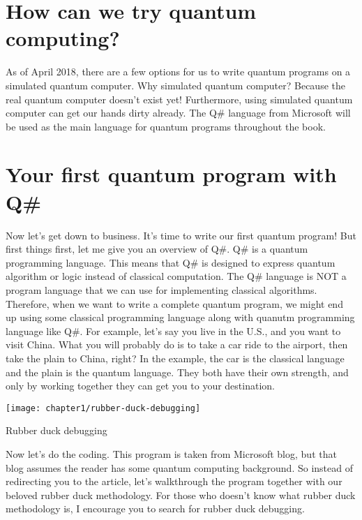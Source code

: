 \section{\textbf{How} can we try quantum computing?}

\begin{fullwidth}

As of April 2018, there are a few options for us to write quantum programs on a simulated quantum computer.
Why simulated quantum computer? Because the real quantum computer doesn't exist yet!
Furthermore, using simulated quantum computer can get our hands dirty already.
The Q\# language from Microsoft will be used as the main language for quantum programs throughout the book.

\end{fullwidth}


\section{Your first quantum program with Q\#}

\begin{fullwidth}

Now let's get down to business. It's time to write our first quantum program!
But first things first, let me give you an overview of Q\#.
Q\# is a quantum programming language.
This means that Q\# is designed to express quantum algorithm or logic instead of classical computation.
The Q\# language is NOT a program language that we can use for implementing classical algorithms.
Therefore, when we want to write a complete quantum program, we might end up using some classical programming language along with quanutm programming language like Q\#.
For example, let's say you live in the U.S., and you want to visit China.
What you will probably do is to take a car ride to the airport, then take the plain to China, right?
In the example, the car is the classical language and the plain is the quantum language.
They both have their own strength, and only by working together they can get you to your destination.

\end{fullwidth}


\begin{marginfigure}[16\baselineskip]
    \texttt{[image: chapter1/rubber-duck-debugging]}
    \caption{Rubber duck debugging}
    \label{fig:chapter1-rubber-duck-picture}
\end{marginfigure}

Now let's do the coding.
This program is taken from Microsoft blog\cite{Chapter1-first-quantum-program}, but that blog assumes the reader has some quantum computing background.
So instead of redirecting you to the article, let's walkthrough the program together with our beloved rubber duck methodology\cite{Chapter1-rubber-duck}.
For those who doesn't know what rubber duck methodology is, I encourage you to search for rubber duck debugging.


